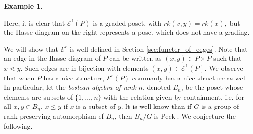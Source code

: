 \documentclass[10 pt]{amsart}
\theoremstyle{plain}
\theoremstyle{definition}
\newtheorem{eg}[thm]{Example}
\theoremstyle{remark}
\numberwithin{equation}{section}
\begin{document}
\begin{eg}
\begin{figure}
\iffalse
\newline
\begin{tikzpicture}[scale=.7]
  \node (one) at (90:2cm) {$6$};
  \node (b) at (150:2cm) {$4$};
  \node (a) at (210:2cm) {$2$};
  \node (zero) at (270:2cm) {$1$};
  \node (c) at (330:2cm) {$3$};
  \node (d) at (30:2cm) {$5$};
  \draw (zero) -- (a) -- (b) -- (one) -- (d) -- (c) -- (zero);
\end{tikzpicture}
\begin{tikzpicture}[scale=.7]
  \node (one) at (60:2cm) {$(5, 6)$};
  \node (b) at (120:2cm) {$(4, 6)$};
  \node (a) at (180:2cm) {$(2, 4)$};
  \node (zero) at (240:2cm) {$(1, 2)$};
  \node (c) at (300:2cm) {$(1,3)$};
  \node (d) at (0:2cm) {$(3, 5)$};
  \draw (zero) -- (a) -- (b);
  \draw (c)--(d)--(one);
\end{tikzpicture}
\begin{tikzpicture}[scale=.7]
  \node (one) at (60:2cm) {$(5, 6)$};
  \node (b) at (120:2cm) {$(4, 6)$};
  \node (a) at (180:2cm) {$(2, 4)$};
  \node (zero) at (240:2cm) {$(1, 2)$};
  \node (c) at (300:2cm) {$(1, 3)$};
  \node (d) at (0:2cm) {$(3, 5)$};
  \draw (zero) -- (a) -- (b) -- (c)--(d)--(one) -- (zero);
\end{tikzpicture}
\fi
\end{figure}
Here, it is clear that $\mathcal E^1(P)$ is a graded poset, with $rk(x,y) = rk(x),$ but the Hasse diagram on the right represents a poset which does not have a grading.
\end{eg}



We will show that $\mathcal E^r$ is well-defined in Section \ref{sec:functor_of_edges}. Note that an edge in the Hasse diagram of $P$ can be written as $(x,y)\in P\times P$ such that $x\lessdot y$. Such edges are in bijection with elements $(x, y)\in \mathcal E^1(P).$  
We observe that when $P$ has a nice structure, $\mathcal E^r(P)$ commonly has a nice structure as well.  
In particular, let the \textit{boolean algebra of rank $n$}, denoted $B_n$, be the poset whose elements are subsets of $\{1,\ldots,n\}$ with the relation given by containment, i.e. for all $x,y\in B_n$, $x\le y$ if $x$ is a subset of $y$.  
It is well-know than if $G$ is a group of rank-preserving  automorphism of $B_n$, then $B_n/G$ is Peck .  We conjecture the following.
\end{document}
